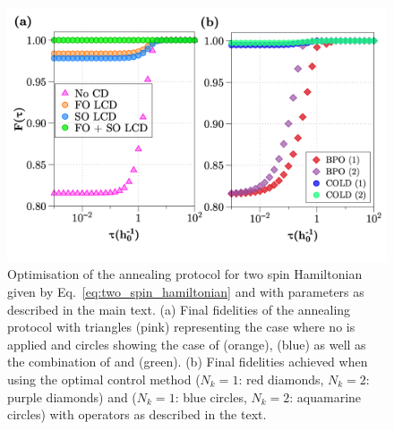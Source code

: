 \begin{figure}[t]
    \centering
    \includegraphics[width=0.8\linewidth]{images/twospins_fidelities.png} \caption[COLD applied to two-spin annealing]{Optimisation of the annealing protocol for two spin Hamiltonian given by Eq.~\eqref{eq:two_spin_hamiltonian} and with parameters as described in the main text.  (a) Final fidelities of the annealing protocol with triangles (pink) representing the case where no  is applied and circles showing the case of   (orange),   (blue) as well as the combination of  and   (green). (b) Final fidelities achieved when using the optimal control method  ($N_k = 1$: red diamonds, $N_k = 2$: purple diamonds) and  ($N_k = 1$: blue circles, $N_k = 2$: aquamarine circles) with   operators as described in the text.}\label{fig:twospin_fidelities}
\end{figure}

